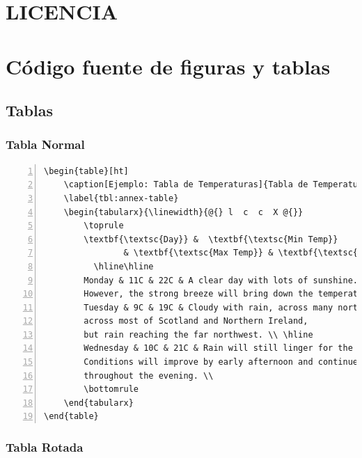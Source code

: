 \chapter{LICENCIA}\label{appx:licencia}

{\footnotesize
 
}

\chapter{Código fuente de figuras y tablas}
\label{annex:code}

\section{Tablas}

\subsection{Tabla Normal}

\begin{Verbatim}[frame=lines, label=\autoref{tbl:temperaturas} Ejemplo Tabla
				, fontsize=\footnotesize, numbers=left
				, baselinestretch=1
				, formatcom=\color{gray}]
\begin{table}[ht]
    \caption[Ejemplo: Tabla de Temperaturas]{Tabla de Temperaturas}
    \label{tbl:annex-table}
    \begin{tabularx}{\linewidth}{@{} l  c  c  X @{}}
        \toprule
        \textbf{\textsc{Day}} &  \textbf{\textsc{Min Temp}} 
        		& \textbf{\textsc{Max Temp}} & \textbf{\textsc{Summary}}\\
    	  \hline\hline
        Monday & 11C & 22C & A clear day with lots of sunshine.
        However, the strong breeze will bring down the temperatures. \\ \hline
        Tuesday & 9C & 19C & Cloudy with rain, across many northern regions. Clear spells
        across most of Scotland and Northern Ireland,
        but rain reaching the far northwest. \\ \hline
        Wednesday & 10C & 21C & Rain will still linger for the morning.
        Conditions will improve by early afternoon and continue
        throughout the evening. \\
        \bottomrule
    \end{tabularx}
\end{table}
\end{Verbatim}

\subsection{Tabla Rotada}

